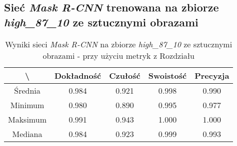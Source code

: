 \subsection{Sieć \textit{Mask R-CNN} trenowana na zbiorze \textit{high\_87\_10} ze sztucznymi obrazami}
\label{sec:results_high_original_generated}

\begin{table}[H]
	\centering
	\caption{Wyniki sieci \textit{Mask R-CNN} na zbiorze \textit{high\_87\_10} ze sztucznymi obrazami - przy użyciu metryk z Rozdziału }
	\vspace{6pt}
	{\footnotesize
		\begin{tabular}{|c|c|c|c|c|}
      \hline \textbackslash & Dokładność & Czułość & Swoistość & Precyzja \\
      \hline Średnia & 0.984 & 0.921 & 0.998 & 0.990 \\
      \hline Minimum & 0.980 & 0.890 & 0.995 & 0.977 \\
      \hline Maksimum & 0.991 & 0.943 & 1.000 & 1.000 \\
      \hline Mediana & 0.984 & 0.923 & 0.999 & 0.993 \\
      \hline
		\end{tabular}
	}
  \vspace{0pt}
  \label{Tab:high_original_generated_calculated}
\end{table}

